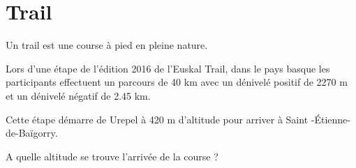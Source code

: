 \section{Trail}

Un trail est une course à pied en pleine nature.

Lors d'une étape de l'édition 2016 de l'Euskal Trail, dans le pays basque les participants effectuent un parcours de 40 km avec un dénivelé positif de \num{2270} m et un dénivelé négatif de \num{2.45} km.

Cette étape démarre de Urepel à 420 m d'altitude pour arriver à Saint -\'Etienne-de-Baïgorry.

\begin{questions}
	\question A quelle altitude se trouve l'arrivée de la course ?
\end{questions}